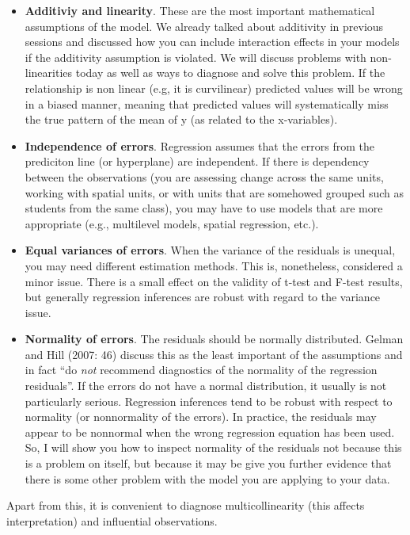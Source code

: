 \documentclass[
]{book}
\begin{document}
\begin{itemize}
\item
  \textbf{Additiviy and linearity}. These are the most important mathematical assumptions of the model. We already talked about additivity in previous sessions and discussed how you can include interaction effects in your models if the additivity assumption is violated. We will discuss problems with non-linearities today as well as ways to diagnose and solve this problem. If the relationship is non linear (e.g, it is curvilinear) predicted values will be wrong in a biased manner, meaning that predicted values will systematically miss the true pattern of the mean of y (as related to the x-variables).
\item
  \textbf{Independence of errors}. Regression assumes that the errors from the prediciton line (or hyperplane) are independent. If there is dependency between the observations (you are assessing change across the same units, working with spatial units, or with units that are somehowed grouped such as students from the same class), you may have to use models that are more appropriate (e.g., multilevel models, spatial regression, etc.).
\item
  \textbf{Equal variances of errors}. When the variance of the residuals is unequal, you may need different estimation methods. This is, nonetheless, considered a minor issue. There is a small effect on the validity of t-test and F-test results, but generally regression inferences are robust with regard to the variance issue.
\item
  \textbf{Normality of errors}. The residuals should be normally distributed. Gelman and Hill (2007: 46) discuss this as the least important of the assumptions and in fact ``do \emph{not} recommend diagnostics of the normality of the regression residuals''. If the errors do not have a normal distribution, it usually is not particularly serious. Regression inferences tend to be robust with respect to normality (or nonnormality of the errors). In practice, the residuals may appear to be nonnormal when the wrong regression equation has been used. So, I will show you how to inspect normality of the residuals not because this is a problem on itself, but because it may be give you further evidence that there is some other problem with the model you are applying to your data.
\end{itemize}

Apart from this, it is convenient to diagnose multicollinearity (this affects interpretation) and influential observations.
\end{document}
